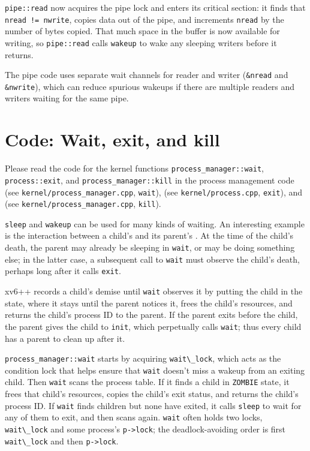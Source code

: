 \lstinline{pipe::read}
now acquires the pipe lock and enters its critical section:
it finds that
\lstinline{nread != nwrite},
copies data out of the pipe, and increments
\lstinline{nread}
by the number of bytes copied.
That much space in the buffer is now available for writing, so
\lstinline{pipe::read}
calls
\lstinline{wakeup}
to wake any sleeping writers before it returns.

The pipe code uses separate wait channels for reader and writer
(\lstinline{&nread}
and
\lstinline{&nwrite}),
which can reduce spurious wakeups if there are multiple readers
and writers waiting for the same pipe.

\section{Code: Wait, exit, and kill}

Please read the code for the kernel functions
\texttt{process\_manager::wait}, \texttt{process::exit}, and
\texttt{process\_manager::kill}
in the process management code
(see \texttt{kernel/process\_manager.cpp}, \texttt{wait}),
(see \texttt{kernel/process.cpp}, \texttt{exit}),
and
(see \texttt{kernel/process\_manager.cpp}, \texttt{kill}).

\lstinline{sleep}
and
\lstinline{wakeup}
can be used for many kinds of waiting.
An interesting example is the interaction between a child's
and its parent's
.
At the time of the child's death, the parent may already
be sleeping in \lstinline{wait}, or may be doing something else;
in the latter case, a subsequent call to \lstinline{wait} must
observe the child's death, perhaps long after it calls \lstinline{exit}.

xv6++ records a child's demise until \lstinline{wait}
observes it by putting the child in the 
state, where it stays until the parent notices it, frees the child's
resources, and returns the child's process ID to the parent.
If the parent exits before the child, the parent gives the child to
\lstinline{init}, which perpetually calls \lstinline{wait};
thus every child has a parent to clean up after it.

\lstinline{process_manager::wait} starts by acquiring
\lstinline{wait\_lock},
which acts as the condition lock that helps ensure that
\lstinline{wait} doesn't miss a wakeup from an exiting child.
Then \lstinline{wait} scans the process table.
If it finds a child in \texttt{ZOMBIE} state,
it frees that child's resources, copies the child's exit status,
and returns the child's process ID.
If \lstinline{wait} finds children but none have exited,
it calls \lstinline{sleep} to wait for any of them to exit,
and then scans again.
\lstinline{wait} often holds two locks,
\lstinline{wait\_lock} and some process's \lstinline{p->lock};
the deadlock-avoiding order is first \lstinline{wait\_lock}
and then \lstinline{p->lock}.

